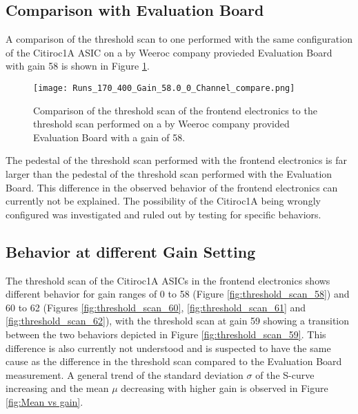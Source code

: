     \subsection{Comparison with Evaluation Board} 
    A comparison of the threshold scan to one performed with the same configuration of the Citiroc1A ASIC on a by Weeroc company provieded Evaluation Board with gain 58 is shown in Figure \ref{fig:threshold_scan_comparison_58}.%
    \begin{figure}[H]
        \centering
        \texttt{[image: Runs\_170\_400\_Gain\_58.0\_0\_Channel\_compare.png]}
        \caption{Comparison of the threshold scan of the frontend electronics to the threshold scan performed on a by Weeroc company provided Evaluation Board with a gain of 58.}
        \label{fig:threshold_scan_comparison_58}
    \end{figure}
    
 
    The pedestal of the threshold scan performed with the frontend electronics is far larger than the pedestal of the threshold scan performed with the Evaluation Board.
    This difference in the observed behavior of the frontend electronics can currently not be explained.
    The possibility of the Citiroc1A being wrongly configured was investigated and ruled out by testing for specific behaviors.
  
    \subsection{Behavior at different Gain Setting}
    The threshold scan of the Citiroc1A ASICs in the frontend electronics shows different behavior for gain ranges of 0 to 58 (Figure \ref{fig:threshold_scan_58}) and 60 to 62 (Figures \ref{fig:threshold_scan_60}, \ref{fig:threshold_scan_61} and \ref{fig:threshold_scan_62}),
    with the threshold scan at gain 59 showing a transition between the two behaviors depicted in Figure \ref{fig:threshold_scan_59}.
    This difference is also currently not understood and is suspected to have the same cause as the difference in the threshold scan compared to the Evaluation Board measurement. 
    \newline
    A general trend of the standard deviation $\sigma$ of the S-curve increasing and the mean $\mu$ decreasing with higher gain is observed in Figure \ref{fig:Mean vs gain}.
